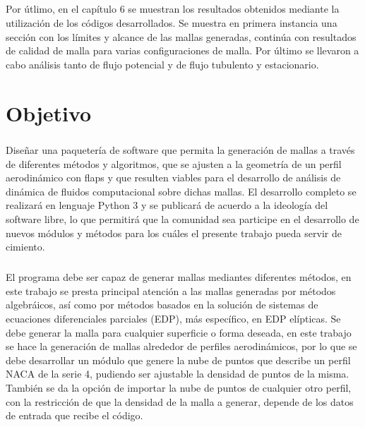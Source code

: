\documentclass[letterpaper, openright, 12pt]{book}
\begin{document}
    \paragraph*{}
    Por útlimo, en el capítulo 6 se muestran los resultados obtenidos mediante
    la utilización de los códigos desarrollados. Se muestra en primera
    instancia una sección con los límites y alcance de las mallas generadas,
    continúa con resultados de calidad de malla para varias configuraciones de
    malla. Por último se llevaron a cabo análisis tanto de flujo potencial y de
    flujo tubulento y estacionario.


    \chapter*{Objetivo}

    \paragraph*{}
    Diseñar una paquetería de software que permita la generación de mallas a
    través de diferentes métodos y algoritmos, que se ajusten a la geometría de
    un perfil aerodinámico con flaps y que resulten viables para el desarrollo
    de análisis  de dinámica de fluidos computacional sobre dichas mallas.
    El desarrollo completo se realizará en lenguaje Python 3 y se publicará de
    acuerdo a la ideología del software libre, lo que permitirá que la comunidad
    sea participe en el desarrollo de nuevos módulos y métodos para los cuáles
    el presente trabajo pueda servir de cimiento.

    \paragraph*{}
    El programa debe ser capaz de generar  mallas mediantes diferentes
    métodos, en este trabajo se presta principal atención a las mallas
    generadas por métodos algebráicos, así como por métodos basados en la
    solución de sistemas de ecuaciones diferenciales parciales (EDP),
    más específico, en EDP elípticas. Se debe generar la malla para
    cualquier superficie o forma deseada, en este trabajo se hace la
    generación de mallas alrededor de perfiles aerodinámicos, por lo que se
    debe desarrollar un módulo que genere la nube de puntos que describe un
    perfil NACA de la serie 4, pudiendo ser ajustable la densidad de puntos
    de la misma. También se da la opción de importar la nube de puntos de
    cualquier otro perfil, con la restricción de que la densidad de la malla a
    generar, depende de los datos de entrada que recibe el código.
\end{document}
